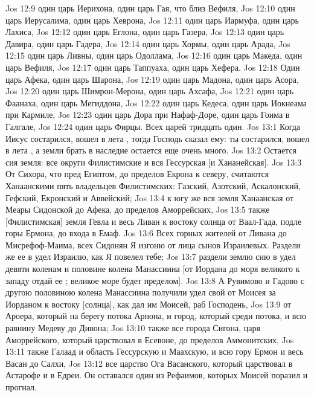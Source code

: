 \vs Jos 12:9 один царь Иерихона, один царь Гая, что близ Вефиля,
\vs Jos 12:10 один царь Иерусалима, один царь Хеврона,
\vs Jos 12:11 один царь Иармуфа, один царь Лахиса,
\vs Jos 12:12 один царь Еглона, один царь Газера,
\vs Jos 12:13 один царь Давира, один царь Гадера,
\vs Jos 12:14 один царь Хормы, один царь Арада,
\vs Jos 12:15 один царь Ливны, один царь Одоллама,
\vs Jos 12:16 один царь Македа, один царь Вефиля,
\vs Jos 12:17 один царь Таппуаха, один царь Хефера.
\vs Jos 12:18 Один царь Афека, один царь Шарона,
\vs Jos 12:19 один царь Мадона, один царь Асора,
\vs Jos 12:20 один царь Шимрон-Мерона, один царь Ахсафа,
\vs Jos 12:21 один царь Фаанаха, один царь Мегиддона,
\vs Jos 12:22 один царь Кедеса, один царь Иокнеама при Кармиле,
\vs Jos 12:23 один царь Дора при Нафаф-Доре, один царь Гоима в Галгале,
\vs Jos 12:24 один царь Фирцы. Всех царей тридцать один.
\vs Jos 13:1 Когда Иисус состарился, вошел в лета , тогда Господь сказал ему: ты состарился, вошел в лета , а земли брать в наследие остается еще очень много.
\vs Jos 13:2 Остается сия земля: все округи Филистимские и вся  Гессурская [и Хананейская].
\vs Jos 13:3 От Сихора, что пред Египтом, до пределов Екрона к северу, считаются Ханаанскими пять владельцев Филистимских: Газский, Азотский, Аскалонский, Гефский, Екронский и Аввейский;
\vs Jos 13:4 к югу же вся земля Ханаанская от Меары Сидонской до Афека, до пределов Аморрейских,
\vs Jos 13:5 также [Филистимская] земля Гевла и весь Ливан к востоку солнца от Ваал-Гада,  подле горы Ермона, до входа в Емаф.
\vs Jos 13:6 Всех горных жителей от Ливана до Мисрефоф-Маима, всех Сидонян Я изгоню от лица сынов Израилевых. Раздели же ее в удел Израилю, как Я повелел тебе;
\vs Jos 13:7 раздели землю сию в удел девяти коленам и половине колена Манассиина [от Иордана до моря великого к западу отдай ее ; великое море будет пределом].
\vs Jos 13:8 А  Рувимово и Гадово с другою половиною колена Манассиина получили удел свой от Моисея за Иорданом к востоку [солнца], как дал им Моисей, раб Господень,
\vs Jos 13:9 от Ароера, который на берегу потока Арнона, и город, который среди потока, и всю равнину Медеву до Дивона;
\vs Jos 13:10 также все города Сигона, царя Аморрейского, который царствовал в Есевоне, до пределов Аммонитских,
\vs Jos 13:11 также Галаад и область Гессурскую и Маахскую, и всю гору Ермон и весь Васан до Салхи,
\vs Jos 13:12 все царство Ога Васанского, который царствовал в Астарофе и в Едреи. Он оставался один из Рефаимов, которых Моисей поразил и прогнал.
